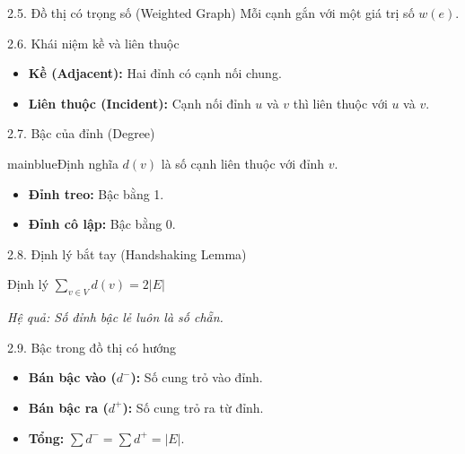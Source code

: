 \documentclass[10pt, xcolor={dvipsnames}]{beamer}
\begin{document}
\begin{frame}{2.5. Đồ thị có trọng số (Weighted Graph)}
    Mỗi cạnh gắn với một giá trị số $w(e)$.
    \centering
\end{frame}

\begin{frame}{2.6. Khái niệm kề và liên thuộc}
    \begin{itemize}
        \item \textbf{Kề (Adjacent):} Hai đỉnh có cạnh nối chung.
        \item \textbf{Liên thuộc (Incident):} Cạnh nối đỉnh $u$ và $v$ thì liên thuộc với $u$ và $v$.
    \end{itemize}
\end{frame}

\begin{frame}{2.7. Bậc của đỉnh (Degree)}
    \begin{detailbox}{mainblue}{Định nghĩa}
        $d(v)$ là số cạnh liên thuộc với đỉnh $v$.
    \end{detailbox}
    \begin{itemize}
        \item \textbf{Đỉnh treo:} Bậc bằng 1.
        \item \textbf{Đỉnh cô lập:} Bậc bằng 0.
    \end{itemize}
\end{frame}

\begin{frame}{2.8. Định lý bắt tay (Handshaking Lemma)}
    \begin{alertblock}{Định lý}
        $\sum_{v \in V} d(v) = 2|E|$
    \end{alertblock}
    \textit{Hệ quả: Số đỉnh bậc lẻ luôn là số chẵn.}
\end{frame}

\begin{frame}{2.9. Bậc trong đồ thị có hướng}
    \begin{itemize}
        \item \textbf{Bán bậc vào ($d^-$):} Số cung trỏ vào đỉnh.
        \item \textbf{Bán bậc ra ($d^+$):} Số cung trỏ ra từ đỉnh.
        \item \textbf{Tổng:} $\sum d^- = \sum d^+ = |E|$.
    \end{itemize}
\end{frame}
\end{document}

